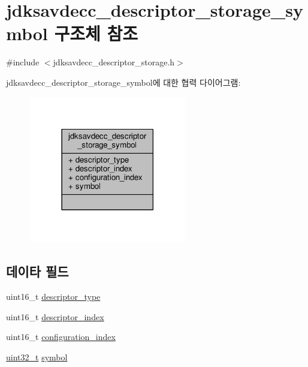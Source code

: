 \hypertarget{structjdksavdecc__descriptor__storage__symbol}{}\section{jdksavdecc\+\_\+descriptor\+\_\+storage\+\_\+symbol 구조체 참조}
\label{structjdksavdecc__descriptor__storage__symbol}


{\ttfamily \#include $<$jdksavdecc\+\_\+descriptor\+\_\+storage.\+h$>$}



jdksavdecc\+\_\+descriptor\+\_\+storage\+\_\+symbol에 대한 협력 다이어그램\+:
\nopagebreak
\begin{figure}[H]
\begin{center}
\leavevmode
\includegraphics[width=194pt]{structjdksavdecc__descriptor__storage__symbol__coll__graph}
\end{center}
\end{figure}
\subsection*{데이타 필드}
\begin{DoxyCompactItemize}
\item 
uint16\+\_\+t \hyperlink{structjdksavdecc__descriptor__storage__symbol_ab7c32b6c7131c13d4ea3b7ee2f09b78d}{descriptor\+\_\+type}
\item 
uint16\+\_\+t \hyperlink{structjdksavdecc__descriptor__storage__symbol_a042bbc76d835b82d27c1932431ee38d4}{descriptor\+\_\+index}
\item 
uint16\+\_\+t \hyperlink{structjdksavdecc__descriptor__storage__symbol_afaad1bd7c66f9611e134d8c5ce98f444}{configuration\+\_\+index}
\item 
\hyperlink{parse_8c_a6eb1e68cc391dd753bc8ce896dbb8315}{uint32\+\_\+t} \hyperlink{structjdksavdecc__descriptor__storage__symbol_a0a81ee27053a63e71a6c7db060562eb0}{symbol}
\end{DoxyCompactItemize}


